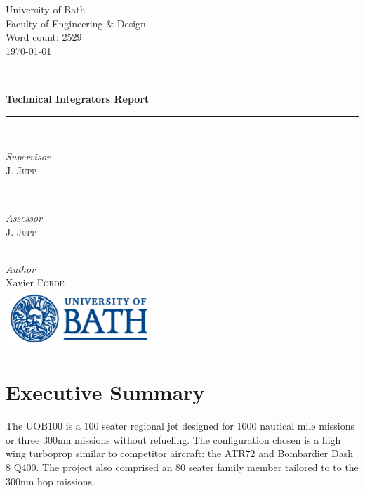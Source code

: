 \documentclass[11pt]{article}
\begin{document}
 
\begin{titlepage}
	\newcommand{\HRule}{\rule{\linewidth}{0.5mm}}	
	\center
	\LARGE 
	University of Bath\\
 	Faculty of Engineering \& Design\\[1cm]	
	\large
	Word count: 2529\\[0.5cm]
	{\large\today}\\[1cm]	
	\HRule\\[0.4cm]	
	{\huge\bfseries Technical Integrators Report}\\[0.4cm] 	
	\HRule\\[1cm]	
	\begin{minipage}{0.4\textwidth}
		\begin{flushleft}
			\large
			\textit{Supervisor}\\
			J. \textsc{Jupp}
		\end{flushleft}
	\end{minipage}
	~
	\begin{minipage}{0.4\textwidth}
		\begin{flushright}
			\large
			\textit{Assessor}\\
			J. \textsc{Jupp} 
		\end{flushright}
	\end{minipage}\\[1.4cm]
	\large
	\textit{Author}\\
	Xavier \textsc{Forde}\\
	\vfill
	\includegraphics[width=0.4\textwidth]{UOB_Logo.png}\\
	\vfill 
\end{titlepage}

\section*{Executive Summary}
The UOB100 is a 100 seater regional jet designed for 1000 nautical mile missions or three 300nm missions without refueling. The configuration chosen is a high wing turboprop similar to competitor aircraft: the ATR72 and Bombardier Dash 8 Q400. The project also comprised an 80 seater family member tailored to to the 300nm hop missions.
\end{document}
